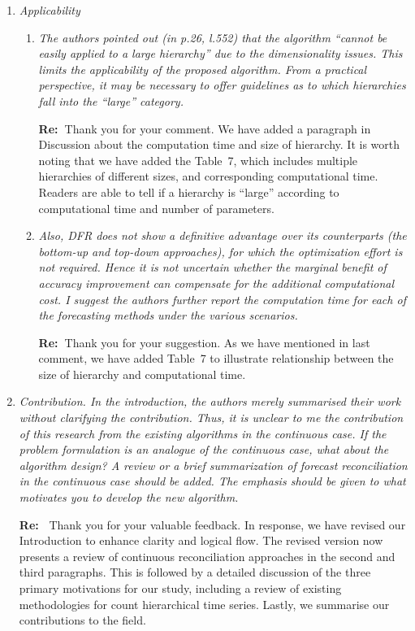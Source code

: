 \documentclass[11pt,a4paper]{article}
\newcommand{\RE}[2][Re:~]{{\color{blue}\textbf{#1}#2}}
\begin{document}
\begin{enumerate}%
\item \textit{Applicability}

  \begin{enumerate}
    \item \textit{The authors pointed out (in p.26, l.552) that the algorithm ``cannot be easily applied to a large hierarchy'' due to the dimensionality issues. This limits the applicability of the proposed algorithm. From a practical perspective, it may be necessary to offer guidelines as to which hierarchies fall into the ``large'' category. }

    \RE{Thank you for your comment. We have added a paragraph in Discussion about the computation time and size of hierarchy. It is worth noting that we have added the Table~7, which includes multiple hierarchies of different sizes, and corresponding computational time. Readers are able to tell if a hierarchy is ``large'' according to computational time and number of parameters.}


    \item \textit{Also, DFR does not show a definitive advantage over its counterparts (the bottom-up and top-down approaches), for which the optimization effort is not required. Hence it is not uncertain whether the marginal benefit of accuracy improvement can compensate for the additional computational cost. I suggest the authors further report the computation time for each of the forecasting methods under the various scenarios.}

    \RE{Thank you for your suggestion. As we have mentioned in last comment, we have added Table~7 to illustrate relationship between the size of hierarchy and computational time.}


  \end{enumerate}

\item \textit{Contribution. In the introduction, the authors merely summarised their work without clarifying the contribution. Thus, it is unclear to me the contribution of this research from the existing algorithms in the continuous case. If the problem formulation is an analogue of the continuous case, what about the algorithm design? A review or a brief summarization of forecast reconciliation in the continuous case should be added. The emphasis should be given to what motivates you to develop the new algorithm.}

\RE{
  Thank you for your valuable feedback. In response, we have revised our Introduction to enhance clarity and logical flow. The revised version now presents a review of continuous reconciliation approaches in the second and third paragraphs. This is followed by a detailed discussion of the three primary motivations for our study, including a review of existing methodologies for count hierarchical time series. Lastly, we summarise our contributions to the field.  
}



\end{enumerate}
\end{document}
